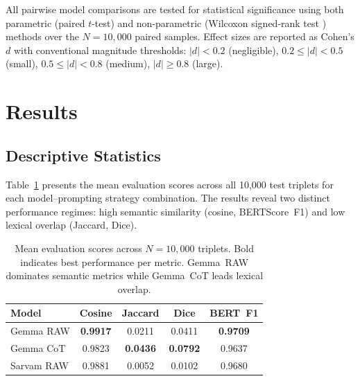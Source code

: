 \documentclass[11pt]{article}
\begin{document}
All pairwise model comparisons are tested for statistical significance using both parametric (paired $t$-test) and non-parametric (Wilcoxon signed-rank test \citep{wilcoxon-1945-individual}) methods over the $N = 10{,}000$ paired samples. Effect sizes are reported as Cohen's $d$ \citep{cohen-1988-statistical} with conventional magnitude thresholds: $|d| < 0.2$ (negligible), $0.2 \leq |d| < 0.5$ (small), $0.5 \leq |d| < 0.8$ (medium), $|d| \geq 0.8$ (large).

\section{Results}
\label{sec:results}

\subsection{Descriptive Statistics}
\label{subsec:descriptive}

Table~\ref{tab:main-results} presents the mean evaluation scores across all 10,000 test triplets for each model--prompting strategy combination. The results reveal two distinct performance regimes: high semantic similarity (cosine, BERTScore~F1) and low lexical overlap (Jaccard, Dice).

\begin{table}[t]
\centering
\small
\begin{tabular}{@{}l cccc@{}}
\toprule
\textbf{Model} & \textbf{Cosine} & \textbf{Jaccard} & \textbf{Dice} & \textbf{BERT~F1} \\
\midrule
Gemma RAW  & \textbf{0.9917} & 0.0211 & 0.0411 & \textbf{0.9709} \\
Gemma CoT  & 0.9823 & \textbf{0.0436} & \textbf{0.0792} & 0.9637 \\
Sarvam RAW & 0.9881 & 0.0052 & 0.0102 & 0.9680 \\
\bottomrule
\end{tabular}
\caption{Mean evaluation scores across $N{=}10{,}000$ triplets. Bold indicates best performance per metric. Gemma~RAW dominates semantic metrics while Gemma~CoT leads lexical overlap.}
\label{tab:main-results}
\end{table}
\end{document}
